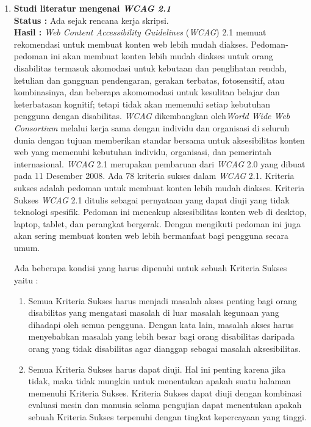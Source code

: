 \documentclass[a4paper,twoside]{article}
\begin{document}
	\begin{enumerate}
		\item \textbf{Studi literatur mengenai \textit{WCAG 2.1}}\\
		{\bf Status :} Ada sejak rencana kerja skripsi.\\
		{\bf Hasil :} \textit{Web Content Accessibility Guidelines} (\textit{WCAG}) 2.1 memuat rekomendasi untuk membuat konten web lebih mudah diakses. Pedoman-pedoman ini akan membuat konten lebih mudah diakses untuk orang disabilitas termasuk akomodasi untuk kebutaan dan penglihatan rendah, ketulian dan gangguan pendengaran, gerakan terbatas, fotosensitif, atau kombinasinya, dan beberapa akomomodasi untuk kesulitan belajar dan keterbatasan kognitif; tetapi tidak akan memenuhi setiap kebutuhan pengguna dengan disabilitas. \textit{WCAG} dikembangkan oleh\textit{World Wide Web Consortium} melalui kerja sama dengan individu dan organisasi di seluruh dunia dengan tujuan memberikan standar bersama untuk aksesibilitas konten web yang memenuhi kebutuhan individu, organisasi, dan pemerintah internasional. \textit{WCAG} 2.1 merupakan pembaruan dari \textit{WCAG} 2.0 yang dibuat pada 11 Desember 2008. Ada 78 kriteria sukses dalam \textit{WCAG} 2.1. Kriteria sukses adalah pedoman untuk membuat konten lebih mudah diakses. Kriteria Sukses \textit{WCAG} 2.1 ditulis sebagai pernyataan yang dapat diuji yang tidak teknologi spesifik. Pedoman ini mencakup aksesibilitas konten web di desktop, laptop, tablet, dan perangkat bergerak. Dengan mengikuti pedoman ini juga akan sering membuat konten web lebih bermanfaat bagi pengguna secara umum.
		
		Ada beberapa kondisi yang harus dipenuhi untuk sebuah Kriteria Sukses yaitu :
		
		\begin{enumerate}
			\item Semua Kriteria Sukses harus menjadi masalah akses penting bagi orang disabilitas yang mengatasi masalah di luar masalah kegunaan yang dihadapi oleh semua pengguna. Dengan kata lain, masalah akses harus menyebabkan masalah yang lebih besar bagi orang disabilitas daripada orang yang tidak disabilitas agar dianggap sebagai masalah aksesibilitas.
			\item Semua Kriteria Sukses harus dapat diuji. Hal ini penting karena jika tidak, maka tidak mungkin untuk menentukan apakah suatu halaman memenuhi Kriteria Sukses. Kriteria Sukses dapat diuji dengan kombinasi evaluasi mesin dan manusia selama pengujian dapat menentukan apakah sebuah Kriteria Sukses terpenuhi dengan tingkat kepercayaan yang tinggi.
		\end{enumerate}
		

\end{enumerate}
\end{document}
